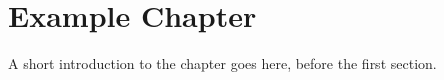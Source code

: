 \chapter{Example Chapter}
\label{ch:example}

A short introduction to the chapter goes here, before the first section.


